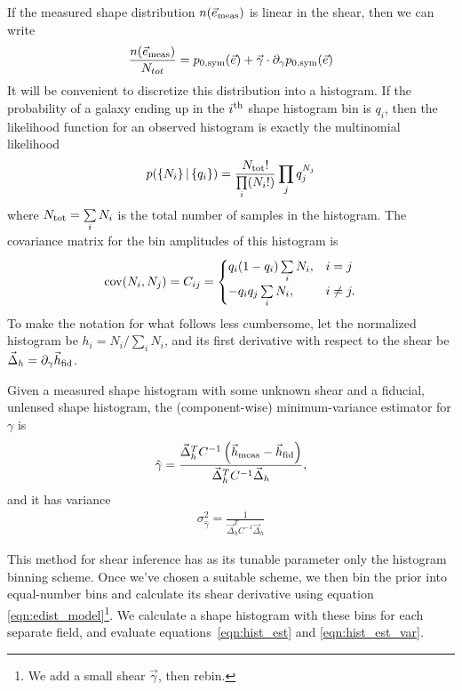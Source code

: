 \documentclass[iop]{emulateapj}
\begin{document}
If the measured shape distribution $n(\vec{e}_{\rm meas})$ is linear
in the shear, then we can write
\begin{align}
\frac{n(\vec{e}_{\rm meas})}{N_{tot}} = p_{0,\rm sym}(\vec{e}) + \vec{\gamma}\cdot \partial_{\gamma} p_{0,\rm sym}(\vec{e})
\end{align}
It will be convenient to discretize this distribution into a
histogram. If the probability of a galaxy ending up in the $i^{\rm
  th}$ shape histogram bin is $q_i$, then the likelihood function for
an observed histogram is exactly the multinomial likelihood
\begin{align}
p( \left\{N_i\right\} |\left\{ q_i\right\} ) = \frac{N_{\rm tot}!}{\prod\limits_i (N_i!)}\prod\limits_j q_j^{N_j}
\label{eqn:multnomial}
\end{align}
where $N_{\rm tot} = \sum\limits_i N_i$ is the total number of samples
in the histogram.  The covariance matrix for the bin amplitudes of
this histogram is
\begin{align}
{\rm cov}(N_i, N_j) = C_{ij} = \begin{cases}
  q_i(1-q_i)\sum\limits_i N_i, & i=j \\
  -q_iq_j \sum\limits_i N_i, & i \neq j.
\end{cases}
\end{align}
To make the notation for what follows less cumbersome, let the
normalized histogram be $h_i = N_i / \sum\limits_i N_i$, and its first
derivative with respect to the shear be
$\vec{\Delta}_h=\partial_{\gamma}\vec{h}_{\rm fid}$.

Given a measured shape histogram with some unknown shear and a
fiducial, unlensed shape histogram, the (component-wise)
minimum-variance estimator for $\gamma$ is
\begin{align}
\hat{\gamma} = \frac{\vec{\Delta}_h^T C^{-1}\left( \vec{h}_{\rm meas} - \vec{h}_{\rm fid}\right)} {\vec{\Delta}_h^TC^{-1}\vec{\Delta}_h},
\label{eqn:hist_est}
\end{align}
and it has variance
\begin{align}
\sigma^2_{\hat{\gamma}} = \frac{1}{\vec{\Delta}_h^TC^{-1}\vec{\Delta}_h}
\label{eqn:hist_est_var}
\end{align}

This method for shear inference has as its tunable parameter only the
histogram binning scheme. Once we've chosen a suitable scheme, we then
bin the prior into equal-number bins and calculate its shear
derivative using equation \ref{eqn:edist_model}\footnote{We add a
  small shear $\vec{\gamma}$, then rebin.}. We calculate a shape
histogram with these bins for each separate field, and evaluate
equations~\ref{eqn:hist_est} and \ref{eqn:hist_est_var}.
\end{document}
